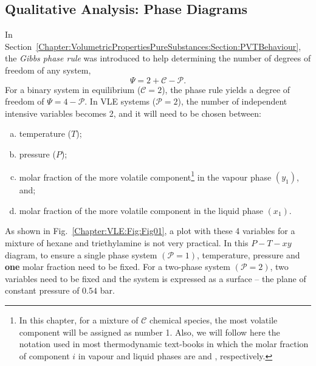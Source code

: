 \subsection{Qualitative Analysis: Phase Diagrams}\label{Chapter:VLE:Section:PhaseDiagrams}
In Section~\ref{Chapter:VolumetricPropertiesPureSubstances:Section:PVTBehaviour}, the {\it Gibbs phase rule} was introduced to help determining the number of degrees of freedom of any system,
    \begin{displaymath}
        \Psi = 2 + \mathcal{C} - \mathcal{P}.
    \end{displaymath}
For a binary system in equilibrium (\ie $\mathcal{C}=2$), the phase rule yields a degree of freedom of $\Psi=4-\mathcal{P}$. In VLE systems ($\mathcal{P}=2$), the number of independent intensive variables becomes 2, and it will need to be chosen between:
\begin{enumerate}[a)]
   \item temperature ($T$);
   \item pressure ($P$);
   \item molar fraction of the more volatile component\footnote{In this chapter, for a mixture of $\mathcal{C}$ chemical species, the most volatile component will be assigned as number 1. Also, we will follow here the notation used in most thermodynamic text-books in which the molar fraction of component $i$ in vapour and liquid phases are  and , respectively.} in the vapour phase $\left(y_{1}\right)$, and;
   \item molar fraction of the more volatile component in the liquid phase $\left(x_{1}\right)$.
\end{enumerate}
As shown in Fig.~\ref{Chapter:VLE:Fig:Fig01}, a plot with these 4 variables for a mixture of hexane and triethylamine is not very practical. In this $P-T-xy$ diagram, to ensure a single phase system $\left(\mathcal{P}=1\right)$, temperature, pressure and {\bf one} molar fraction need to be fixed. For a two-phase system $\left(\mathcal{P}=2\right)$, two variables need to be fixed and the system is expressed as a surface -- \eg the plane of constant pressure of $0.54$ bar. %
